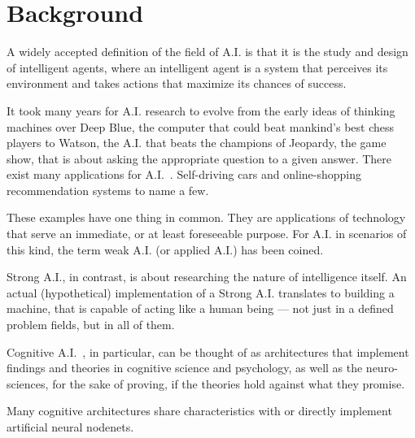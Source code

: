 \chapter{Background}

A widely accepted definition of the field of A.I. is that it is the study and design of intelligent agents, where an intelligent agent is a system that perceives its environment and takes actions that maximize its chances of success. %

It took many years for A.I. research to evolve from the early ideas of thinking machines over Deep Blue, the computer that could beat mankind's best chess players to Watson, the A.I. that beats the champions of Jeopardy, the game show, that is about asking the appropriate question to a given answer. There exist many applications for A.I.~. Self-driving cars and online-shopping recommendation systems to name a few.

These examples have one thing in common. They are applications of technology that serve an immediate, or at least foreseeable purpose. For A.I. in scenarios of this kind, the term weak A.I. (or applied A.I.) has been coined.

Strong A.I., in contrast, is about researching the nature of intelligence itself. An actual (hypothetical) implementation of a Strong A.I. translates to building a machine, that is capable of acting like a human being --- not just in a defined problem fields, but in all of them.

Cognitive A.I.~, in particular, can be thought of as architectures that implement findings and theories in cognitive science and psychology, as well as the neuro-sciences, for the sake of proving, if the theories hold against what they promise. 


Many cognitive architectures share characteristics with or directly implement artificial neural nodenets.


